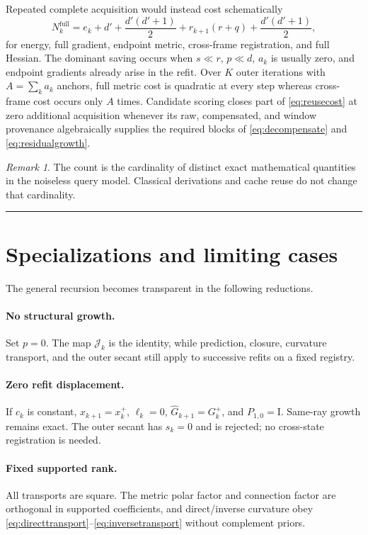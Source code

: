 \documentclass[10pt,twocolumn]{article}
\theoremstyle{definition}
\theoremstyle{remark}
\newtheorem{remark}[theorem]{Remark}
\newcommand{\conceptbreak}{\par\vspace{0.45em}\noindent\textcolor{navy!55}{\rule{\columnwidth}{0.35pt}}\vspace{0.35em}\par}
\newcommand{\Id}{\mathrm I}
\begin{document}
Repeated complete acquisition would instead cost schematically
\begin{equation}
 N_k^{\mathrm{full}}
 =e_k+d'
 +\frac{d'(d'+1)}2
 +r_{k+1}(r+q)
 +\frac{d'(d'+1)}2,
 \label{eq:fullcost}
\end{equation}
for energy, full gradient, endpoint metric, cross-frame registration, and full Hessian.  The dominant saving occurs when $s\ll r$, $p\ll d$, $a_k$ is usually zero, and endpoint gradients already arise in the refit.  Over $K$ outer iterations with $A=\sum_ka_k$ anchors, full metric cost is quadratic at every step whereas cross-frame cost occurs only $A$ times.  Candidate scoring closes part of \eqref{eq:reusecost} at zero additional acquisition whenever its raw, compensated, and window provenance algebraically supplies the required blocks of \eqref{eq:decompensate} and \eqref{eq:residualgrowth}.

\begin{remark}
The count is the cardinality of distinct exact mathematical quantities in the noiseless query model.  Classical derivations and cache reuse do not change that cardinality.
\end{remark}

\conceptbreak

\section{Specializations and limiting cases}
\label{sec:limits}

The general recursion becomes transparent in the following reductions.

\paragraph{No structural growth.}
Set $p=0$.  The map $\mathcal J_k$ is the identity, while prediction, closure, curvature transport, and the outer secant still apply to successive refits on a fixed registry.

\paragraph{Zero refit displacement.}
If $c_k$ is constant, $x_{k+1}=x_k^+$, $\ell_k=0$, $\widehat G_{k+1}=G_k^+$, and $P_{1,0}=\Id$.  Same-ray growth remains exact.  The outer secant has $s_k=0$ and is rejected; no cross-state registration is needed.

\paragraph{Fixed supported rank.}
All transports are square.  The metric polar factor and connection factor are orthogonal in supported coefficients, and direct/inverse curvature obey \eqref{eq:directtransport}--\eqref{eq:inversetransport} without complement priors.
\end{document}
